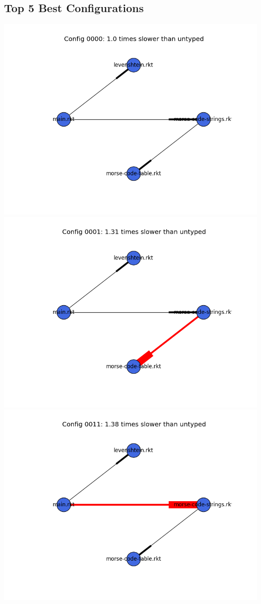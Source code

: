 \documentclass{article}
\begin{document}
\begin{itemize}
\subsection{Top 5 Best Configurations}
\includegraphics[width=\textwidth]{morse-code-module-graph-0000.png}
\includegraphics[width=\textwidth]{morse-code-module-graph-0001.png}
\includegraphics[width=\textwidth]{morse-code-module-graph-0011.png}

\end{itemize}
\end{document}
